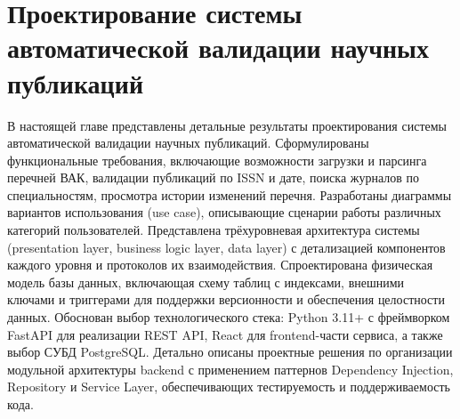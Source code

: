 \chapter{Проектирование системы автоматической валидации научных публикаций}

В настоящей главе представлены детальные результаты проектирования системы автоматической валидации научных публикаций. 
Сформулированы функциональные требования, включающие возможности загрузки и парсинга перечней ВАК, валидации публикаций по 
ISSN и дате, поиска журналов по специальностям, просмотра истории изменений перечня. Разработаны диаграммы вариантов использования 
(use case), описывающие сценарии работы различных категорий пользователей. 
Представлена трёхуровневая архитектура системы (presentation layer, business logic layer, data layer) с детализацией компонентов 
каждого уровня и протоколов их взаимодействия. 
Спроектирована физическая модель базы данных, включающая схему таблиц с индексами, внешними ключами и триггерами для 
поддержки версионности и обеспечения целостности данных. Обоснован выбор технологического стека: Python 3.11+ с фреймворком FastAPI 
для реализации REST API, React для frontend-части сервиса, а также выбор СУБД PostgreSQL. Детально описаны проектные решения 
по организации модульной архитектуры backend с применением паттернов Dependency 
Injection, Repository и Service Layer, обеспечивающих тестируемость и поддерживаемость кода.
